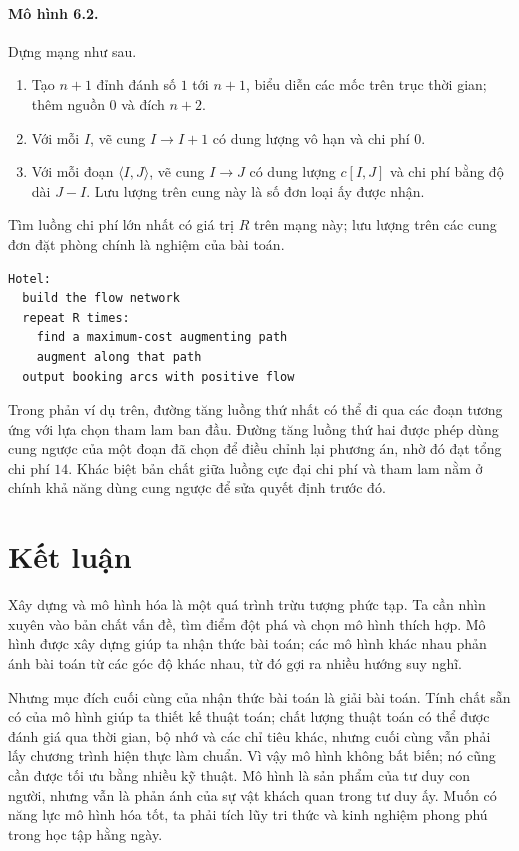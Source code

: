 \documentclass[11pt]{article}
\begin{document}
\paragraph{Mô hình 6.2.}
Dựng mạng như sau.

\begin{enumerate}
  \item Tạo $n+1$ đỉnh đánh số $1$ tới $n+1$, biểu diễn các mốc trên trục
  thời gian; thêm nguồn $0$ và đích $n+2$.
  \item Với mỗi $I$, vẽ cung $I\to I+1$ có dung lượng vô hạn và chi phí $0$.
  \item Với mỗi đoạn $\langle I,J\rangle$, vẽ cung $I\to J$ có dung lượng
  $c[I,J]$ và chi phí bằng độ dài $J-I$. Lưu lượng trên cung này là số đơn
  loại ấy được nhận.
\end{enumerate}

Tìm luồng chi phí lớn nhất có giá trị $R$ trên mạng này; lưu lượng trên các
cung đơn đặt phòng chính là nghiệm của bài toán.

\begin{verbatim}
Hotel:
  build the flow network
  repeat R times:
    find a maximum-cost augmenting path
    augment along that path
  output booking arcs with positive flow
\end{verbatim}

Trong phản ví dụ trên, đường tăng luồng thứ nhất có thể đi qua các đoạn
tương ứng với lựa chọn tham lam ban đầu. Đường tăng luồng thứ hai được phép
dùng cung ngược của một đoạn đã chọn để điều chỉnh lại phương án, nhờ đó đạt
tổng chi phí $14$. Khác biệt bản chất giữa luồng cực đại chi phí và tham lam
nằm ở chính khả năng dùng cung ngược để sửa quyết định trước đó.

\section{Kết luận}

Xây dựng và mô hình hóa là một quá trình trừu tượng phức tạp. Ta cần nhìn
xuyên vào bản chất vấn đề, tìm điểm đột phá và chọn mô hình thích hợp. Mô
hình được xây dựng giúp ta nhận thức bài toán; các mô hình khác nhau phản
ánh bài toán từ các góc độ khác nhau, từ đó gợi ra nhiều hướng suy nghĩ.

Nhưng mục đích cuối cùng của nhận thức bài toán là giải bài toán. Tính chất
sẵn có của mô hình giúp ta thiết kế thuật toán; chất lượng thuật toán có thể
được đánh giá qua thời gian, bộ nhớ và các chỉ tiêu khác, nhưng cuối cùng vẫn
phải lấy chương trình hiện thực làm chuẩn. Vì vậy mô hình không bất biến; nó
cũng cần được tối ưu bằng nhiều kỹ thuật. Mô hình là sản phẩm của tư duy con
người, nhưng vẫn là phản ánh của sự vật khách quan trong tư duy ấy. Muốn có
năng lực mô hình hóa tốt, ta phải tích lũy tri thức và kinh nghiệm phong phú
trong học tập hằng ngày.
\end{document}
